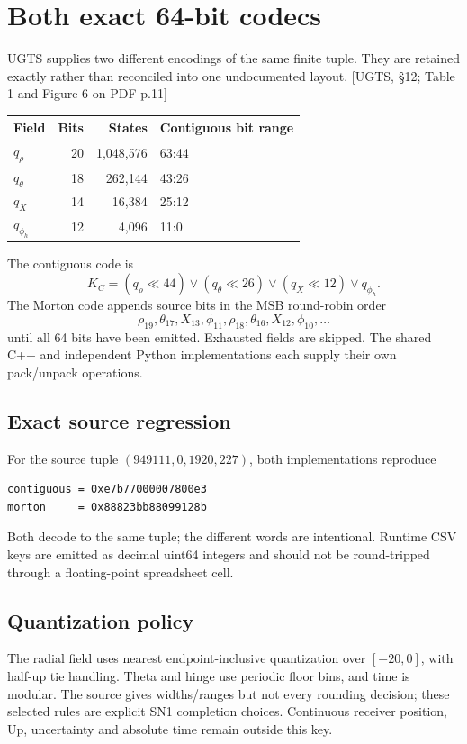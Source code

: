 \documentclass[11pt,a4paper]{article}
\newcommand{\uRef}[1]{\textcolor{muted}{[UGTS, #1]}}
\begin{document}
\section{Both exact 64-bit codecs}
UGTS supplies two different encodings of the same finite tuple. They are retained exactly rather than
reconciled into one undocumented layout. \uRef{\S12; Table 1 and Figure 6 on PDF p.11}
\begin{center}
\begin{tabular}{@{}lrrl@{}}\toprule
\textbf{Field} & \textbf{Bits} & \textbf{States} & \textbf{Contiguous bit range}\\\midrule
$q_\rho$&20&1,048,576&63:44\\
$q_\theta$&18&262,144&43:26\\
$q_X$&14&16,384&25:12\\
$q_{\phi_h}$&12&4,096&11:0\\\bottomrule
\end{tabular}
\end{center}
The contiguous code is
\begin{equation}
K_C=(q_\rho\ll44)\lor(q_\theta\ll26)\lor(q_X\ll12)\lor q_{\phi_h}.
\end{equation}
The Morton code appends source bits in the MSB round-robin order
\begin{equation}
\rho_{19},\theta_{17},X_{13},\phi_{11},\rho_{18},\theta_{16},X_{12},\phi_{10},\ldots
\end{equation}
until all 64 bits have been emitted. Exhausted fields are skipped. The shared C++ and independent Python
implementations each supply their own pack/unpack operations.

\subsection{Exact source regression}
For the source tuple $(949111,0,1920,227)$, both implementations reproduce
\begin{lstlisting}
contiguous = 0xe7b77000007800e3
morton     = 0x88823bb88099128b
\end{lstlisting}
Both decode to the same tuple; the different words are intentional. Runtime CSV keys are emitted as
decimal uint64 integers and should not be round-tripped through a floating-point spreadsheet cell.

\subsection{Quantization policy}
The radial field uses nearest endpoint-inclusive quantization over $[-20,0]$, with half-up tie handling.
Theta and hinge use periodic floor bins, and time is modular. The source gives widths/ranges but not every
rounding decision; these selected rules are explicit SN1 completion choices. Continuous receiver position,
Up, uncertainty and absolute time remain outside this key.
\end{document}
